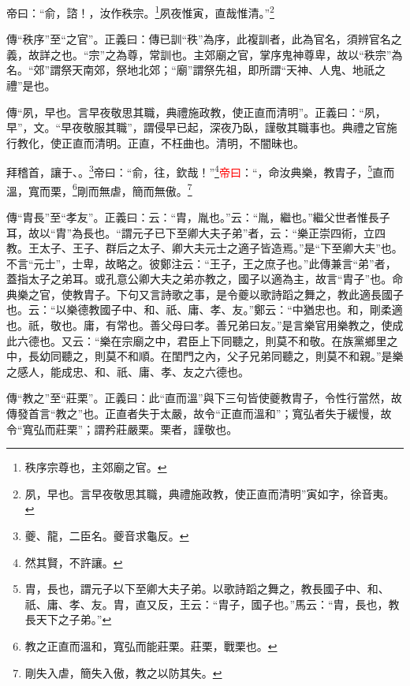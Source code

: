 帝曰：“俞，諮！，汝作秩宗。\footnote{秩序宗尊也，主郊廟之官。}夙夜惟寅，直哉惟清。”\footnote{夙，早也。言早夜敬思其職，典禮施政教，使正直而清明”寅如字，徐音夷。}

{\noindent\zhuan{}\fzbyks 傳“秩序”至“之官”。正義曰：傳已訓“秩”為序，此複訓者，此為官名，須辨官名之義，故詳之也。“宗”之為尊，常訓也。主郊廟之官，掌序鬼神尊卑，故以“秩宗”為名。“郊”謂祭天南郊，祭地北郊；“廟”謂祭先祖，即所謂“天神、人鬼、地祇之禮”是也。 \par}

{\noindent\zhuan{}\fzbyks 傳“夙，早也。言早夜敬思其職，典禮施政教，使正直而清明”。正義曰：“夙，早”，文。“早夜敬服其職”，謂侵早已起，深夜乃臥，謹敬其職事也。典禮之官施行教化，使正直而清明。正直，不枉曲也。清明，不闇昧也。 \par}

拜稽首，讓于、。\footnote{夔、龍，二臣名。夔音求龜反。}帝曰：“俞，往，欽哉！”\footnote{然其賢，不許讓。}\textcolor{red}{帝曰}：“，命汝典樂，教胄子，\footnote{胄，長也，謂元子以下至卿大夫子弟。以歌詩蹈之舞之，教長國子中、和、祇、庸、孝、友。胄，直又反，王云：“胄子，國子也。”馬云：“胄，長也，教長天下之子弟。”}直而溫，寬而栗，\footnote{教之正直而溫和，寬弘而能莊栗。莊栗，戰栗也。}剛而無虐，簡而無傲。\footnote{剛失入虐，簡失入傲，教之以防其失。}

{\noindent\zhuan{}\fzbyks 傳“胄長”至“孝友”。正義曰：云：“胄，胤也。”云：“胤，繼也。”繼父世者惟長子耳，故以“胄”為長也。“謂元子已下至卿大夫子弟”者，云：“樂正崇四術，立四教。王太子、王子、群后之太子、卿大夫元士之適子皆造焉。”是“下至卿大夫”也。不言“元士”，士卑，故略之。彼鄭注云：“王子，王之庶子也。”此傳兼言“弟”者，蓋指太子之弟耳。或孔意公卿大夫之弟亦教之，國子以適為主，故言“胄子”也。命典樂之官，使教胄子。下句又言詩歌之事，是令夔以歌詩蹈之舞之，教此適長國子也。云：“以樂德教國子中、和、祇、庸、孝、友。”鄭云：“中猶忠也。和，剛柔適也。祇，敬也。庸，有常也。善父母曰孝。善兄弟曰友。”是言樂官用樂教之，使成此六德也。又云：“樂在宗廟之中，君臣上下同聽之，則莫不和敬。在族黨鄉里之中，長幼同聽之，則莫不和順。在閨門之內，父子兄弟同聽之，則莫不和親。”是樂之感人，能成忠、和、祇、庸、孝、友之六德也。 \par}

{\noindent\zhuan{}\fzbyks 傳“教之”至“莊栗”。正義曰：此“直而溫”與下三句皆使夔教胄子，令性行當然，故傳發首言“教之”也。正直者失于太嚴，故令“正直而溫和”；寬弘者失于緩慢，故令“寬弘而莊栗”；謂矜莊嚴栗。栗者，謹敬也。 \par}

